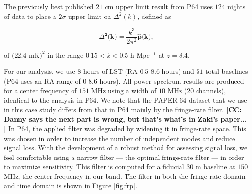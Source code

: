\documentclass[preprint2,numberedappendix,tighten]{aastex6}  %
\newcommand{\cc}[1]{{\color{purple} \textbf{[CC: #1]}}}
\begin{document}
The previously best published $21$ cm upper limit result from P64 uses $124$ nights of data to place a $2\sigma$ upper limit on $\Delta^{2}(k)$, defined as

\begin{equation}
\Delta^{\textbf{2}}\textbf{(k)} = \frac{k^{3}}{2\pi^{2}}\hat{\textbf{p}}\textbf{(k)},
\end{equation}

\noindent of $(22.4$ mK$)^{2}$ in the range $0.15 < k < 0.5$ h Mpc$^{-1}$ at $z = 8.4$. %

For our analysis, we use $8$ hours of LST (RA $0.5$-$8.6$ hours) and $51$ total baselines (P64 uses an RA range of $0$-$8.6$ hours). All power spectrum results are produced for a center frequency of $151$ MHz using a width of $10$ MHz ($20$ channels), identical to the analysis in P64. We note that the PAPER-64 dataset that we use in this case study differs from that in P64 mainly by the fringe-rate filter. \cc{Danny says the next part is wrong, but that's what's in Zaki's paper... } In P64, the applied filter was degraded by widening it in fringe-rate space. This was chosen in order to increase the number of independent modes and reduce signal loss. With the development of a robust method for assessing signal loss, we feel comfortable using a narrow filter --- the optimal fringe-rate filter --- in order to maximize sensitivity. This filter is computed for a fiducial $30$ m baseline at $150$ MHz, the center frequency in our band. The filter in both the fringe-rate domain and time domain is shown in Figure \ref{fig:frp}.
\end{document}

